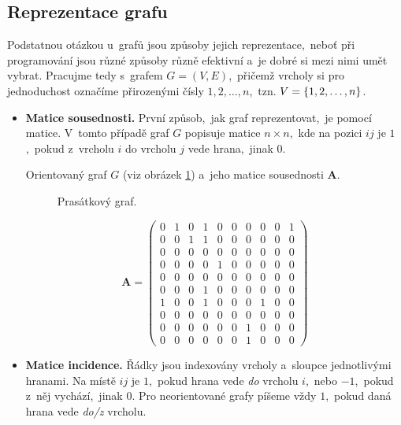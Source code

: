\subsection{Reprezentace grafu}

Podstatnou otázkou u~grafů jsou způsoby jejich reprezentace,~neboť při programování jsou různé způsoby různě efektivní a~je dobré si mezi nimi umět vybrat. Pracujme tedy s~grafem $G=(V,E)$,~přičemž vrcholy si pro jednoduchost označíme přirozenými čísly $1,2,\dots,n$,~tzn. $V=\left\{1,2,\dots,n\right\}$.
\begin{itemize}
    \item \textbf{Matice sousednosti.} První způsob,~jak graf reprezentovat,~je pomocí matice. V~tomto případě graf $G$ popisuje matice $n\times n$,~kde na pozici $ij$ je $1$,~pokud z~vrcholu $i$ do vrcholu $j$ vede hrana,~jinak $0$.
    \begin{example}
        Orientovaný graf $G$ (viz obrázek \ref{fig:graf_prasatko}) a~jeho matice sousednosti $\mathbf{A}$.
        \begin{figure}[ht]
            \centering
            
            \caption{Prasátkový graf.}
            \label{fig:graf_prasatko}
        \end{figure}
        \[\mathbf{A}=\left(\begin{matrix}
            0 & 1 & 0 & 1 & 0 & 0 & 0 & 0 & 0 & 1\\
            0 & 0 & 1 & 1 & 0 & 0 & 0 & 0 & 0 & 0\\
            0 & 0 & 0 & 0 & 0 & 0 & 0 & 0 & 0 & 0\\
            0 & 0 & 0 & 0 & 1 & 0 & 0 & 0 & 0 & 0\\
            0 & 0 & 0 & 0 & 0 & 0 & 0 & 0 & 0 & 0\\
            0 & 0 & 0 & 1 & 0 & 0 & 0 & 0 & 0 & 0\\
            1 & 0 & 0 & 1 & 0 & 0 & 0 & 1 & 0 & 0\\
            0 & 0 & 0 & 0 & 0 & 0 & 0 & 0 & 0 & 0\\
            0 & 0 & 0 & 0 & 0 & 0 & 1 & 0 & 0 & 0\\
            0 & 0 & 0 & 0 & 0 & 0 & 1 & 0 & 0 & 0
        \end{matrix}\right)\]
    \end{example}
    \item \textbf{Matice incidence.} Řádky jsou indexovány vrcholy a~sloupce jednotlivými hranami. Na místě $ij$ je $1$,~pokud hrana vede \emph{do} vrcholu $i$,~nebo $-1$,~pokud z~něj vychází,~jinak $0$. Pro neorientované grafy píšeme vždy $1$,~pokud daná hrana vede \emph{do/z} vrcholu.

\end{itemize}
